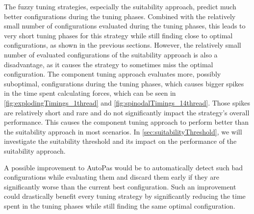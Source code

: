 The fuzzy tuning strategies, especially the suitability approach, predict much better configurations during the tuning phases. Combined with the relatively small number of configurations evaluated during the tuning phases, this leads to very short tuning phases for this strategy while still finding close to optimal configurations, as shown in the previous sections. However, the relatively small number of evaluated configurations of the suitability approach is also a disadvantage, as it causes the strategy to sometimes miss the optimal configuration.
The component tuning approach evaluates more, possibly suboptimal, configurations during the tuning phases, which causes bigger spikes in the time spent calculating forces, which can be seen in \autoref{fig:explodingTimings_1thread} and \autoref{fig:spinodalTimings_14thread}. Those spikes are relatively short and rare and do not significantly impact the strategy's overall performance. This causes the component tuning approach to perform better than the suitability approach in most scenarios.
In \autoref{sec:suitabilityThreshold}, we will investigate the suitability threshold and its impact on the performance of the suitability approach.

\smallskip

A possible improvement to AutoPas would be to automatically detect such bad configurations while evaluating them and discard them early if they are significantly worse than the current best configuration. Such an improvement could drastically benefit every tuning strategy by significantly reducing the time spent in the tuning phases while still finding the same optimal configuration.


\newpage

